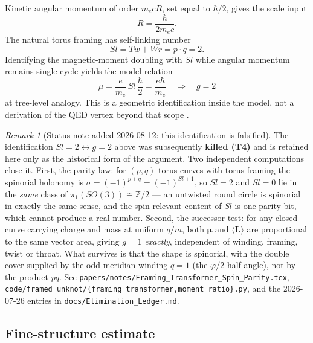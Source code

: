 \documentclass[11pt,a4paper]{article}
\theoremstyle{definition}
\theoremstyle{remark}
\newtheorem{remark}{Remark}[section]
\begin{document}
Kinetic angular momentum of order $m_e c R$, set equal to $\hbar/2$,
gives the scale input
\begin{equation}
R = \frac{\hbar}{2 m_e c}.
\end{equation}
The natural torus framing has self-linking number
\cite{Calugareanu,White,Fuller}
\begin{equation}
Sl = Tw + Wr = p\cdot q = 2.
\end{equation}
Identifying the magnetic-moment doubling with $Sl$ while angular momentum
remains single-cycle yields the model relation
\begin{equation}
\mu = \frac{e}{m_e}\, Sl\, \frac{\hbar}{2} = \frac{e\hbar}{m_e}
\quad\Rightarrow\quad g=2
\end{equation}
at tree-level analogy.  This is a geometric identification inside the
model, not a derivation of the QED vertex beyond that scope
\cite{Mobius2026}.

\begin{remark}[Status note added 2026-08-12: this identification is falsified]
The identification $Sl = 2 \leftrightarrow g = 2$ above was subsequently
\textbf{killed (T4)} and is retained here only as the historical form of the
argument.  Two independent computations close it.  First, the parity law: for
$(p,q)$ torus curves with torus framing the spinorial holonomy is
$\sigma = (-1)^{p+q} = (-1)^{Sl+1}$, so $Sl = 2$ and $Sl = 0$ lie in the
\emph{same} class of $\pi_1(SO(3)) \cong \mathbb{Z}/2$ --- an untwisted round
circle is spinorial in exactly the same sense, and the spin-relevant content of
$Sl$ is one parity bit, which cannot produce a real number.  Second, the
successor test: for any closed curve carrying charge and mass at uniform $q/m$,
both $\boldsymbol\mu$ and $\langle \mathbf{L}\rangle$ are proportional to the
same vector area, giving $g = 1$ \emph{exactly}, independent of winding,
framing, twist or throat.  What survives is that the shape is spinorial, with
the double cover supplied by the odd meridian winding $q = 1$ (the $\varphi/2$
half-angle), not by the product $pq$.  See
\nolinkurl{papers/notes/Framing_Transformer_Spin_Parity.tex},
\texttt{code/framed\_unknot/\{framing\_transformer,moment\_ratio\}.py}, and the
2026-07-26 entries in \nolinkurl{docs/Elimination_Ledger.md}.
\end{remark}

\subsection{Fine-structure estimate}
\end{document}
